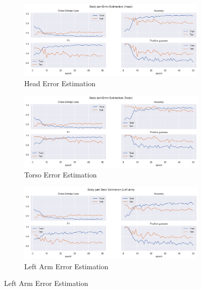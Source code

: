 \begin{figure}[htbp]
  \centering
  \begin{subfigure}[b]{0.9\linewidth}
      \centering
      \includegraphics[width=\textwidth]{figures/Results/v1/bp/Head_ErrorEstimation.png}
      \caption{Head Error Estimation}
      \label{fig:head_lb_ee}
  \end{subfigure}
  \hfill
  \begin{subfigure}[b]{0.9\linewidth}
      \centering
      \includegraphics[width=\textwidth]{figures/Results/v1/bp/Torso_ErrorEstimation.png}
      \caption{Torso Error Estimation}
      \label{fig:torso_lb_ee}
  \end{subfigure}
  \hfill
  \begin{subfigure}[b]{0.9\linewidth}
      \centering
      \includegraphics[width=\textwidth]{figures/Results/v1/bp/Left arm_ErrorEstimation.png}
      \caption{Left Arm Error Estimation}
      \label{fig:lear_lb_ee}
  \end{subfigure}
\end{figure}


